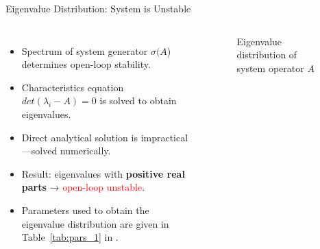 \documentclass[8pt]{beamer}
\begin{document}
\begin{frame}{Eigenvalue Distribution: System is Unstable}

\begin{columns}[c]

\begin{itemize}
    \item Spectrum of system generator $\sigma(A$) determines open-loop stability.
    \item Characteristics equation $det(\lambda_i-A) = 0$ is solved to obtain eigenvalues.
    \item Direct analytical solution is impractical—solved numerically.
    \item Result: eigenvalues with \textbf{positive real parts} → \textcolor{red}{open-loop unstable}.
    \item Parameters used to obtain the eigenvalue distribution are given in Table~\ref{tab:pars_1} in .
\end{itemize}

\begin{figure}
    \centering
    
    \caption{Eigenvalue distribution of system operator \( A \)}
\end{figure}
\end{columns}
\end{frame}
\end{document}
